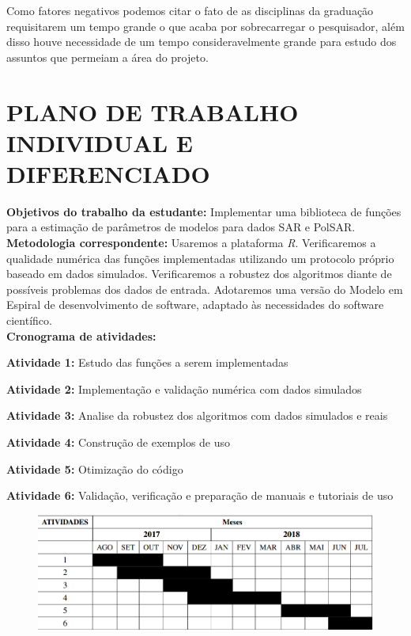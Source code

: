 \documentclass[12pt,letterpaper]{article}
\begin{document}
	Como fatores negativos podemos citar o fato de as disciplinas da graduação
requisitarem um tempo grande o que acaba por sobrecarregar o pesquisador, além disso
houve necessidade de um tempo consideravelmente grande para estudo dos assuntos
que permeiam a área do projeto.



\newpage





\newpage

\section*{\centering \textbf{PLANO DE TRABALHO INDIVIDUAL E DIFERENCIADO}} %

\textbf{Objetivos do trabalho da estudante:} Implementar uma biblioteca de
funções para a estimação de parâmetros de modelos para dados SAR e PolSAR.\\

\textbf{Metodologia correspondente:} Usaremos a plataforma \textit{R}. Verificaremos a qualidade numérica das funções implementadas utilizando um protocolo próprio baseado em dados simulados. Verificaremos a robustez dos algoritmos diante de possíveis problemas dos dados de entrada. Adotaremos uma versão do Modelo em Espiral de desenvolvimento de software, adaptado às necessidades do software científico.\\

\textbf{Cronograma de atividades:}

\textbf{Atividade 1:} Estudo das funções a serem implementadas

\textbf{Atividade 2:} Implementação e validação numérica com dados simulados

\textbf{Atividade 3:} Analise da robustez dos algoritmos com dados simulados e reais

\textbf{Atividade 4:} Construção de exemplos de uso

\textbf{Atividade 5:} Otimização do código

\textbf{Atividade 6:} Validação, verificação e preparação de manuais e tutoriais de uso\\

\begin{figure}[H]
	\begin{center}
		\includegraphics[width=0.95\columnwidth]{cronograma}
	\end{center}
\end{figure}
\end{document}

